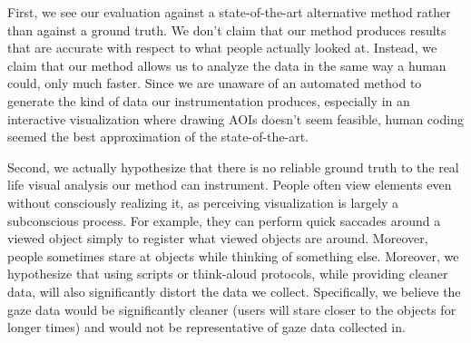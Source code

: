 First, we see our evaluation against a state-of-the-art alternative method rather than against a ground truth. We don't claim that our method produces results that are accurate with respect to what people actually looked at. Instead, we claim that our method allows us to analyze the data in the same way a human could, only much faster. Since we are unaware of an automated method to generate the kind of data our instrumentation produces, especially in an interactive visualization where drawing AOIs doesn't seem feasible, human coding seemed the best approximation of the state-of-the-art. 

Second, we actually hypothesize that there is no reliable ground truth to the real life visual analysis our method can instrument.  People often view elements even without consciously realizing it, as perceiving visualization is largely a subconscious process. For example, they can perform quick saccades around a viewed object simply to register what viewed objects are around. Moreover, people sometimes stare at objects while thinking of something else. Moreover, we  hypothesize that using scripts or think-aloud protocols, while providing cleaner data, will also significantly distort the data we collect. Specifically, we believe the gaze data would be significantly cleaner (users will stare closer to the objects for longer times) and would not be representative of gaze data collected in.
 